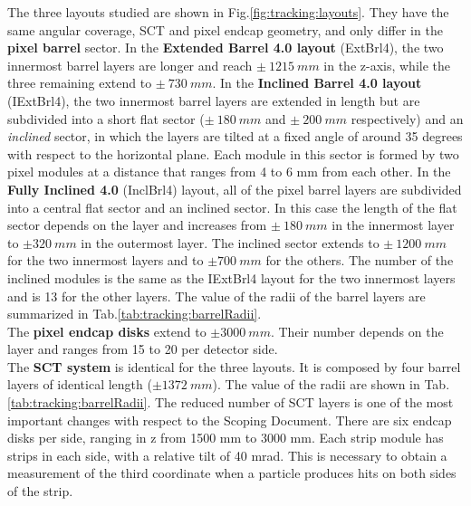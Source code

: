 \documentclass[a4paper,twoside,12pt]{book}
\begin{document}
The three layouts studied are shown in Fig.\ref{fig:tracking:layouts}. They have the same angular coverage, SCT and pixel endcap geometry, and only differ in the \textbf{pixel barrel} sector.
In the \textbf{Extended Barrel 4.0 layout} (ExtBrl4), the two innermost barrel layers are longer and
reach $\pm\ 1215\ mm$ in the z-axis, while the three remaining extend to $\pm\ 730\ mm$.
In the \textbf{Inclined Barrel 4.0 layout} (IExtBrl4), the two innermost barrel layers
are extended in length but are subdivided into a short flat sector ($\pm\ 180\ mm$ and $\pm\ 200\ mm$ respectively) and 
 an \textit{inclined} sector, in which the layers are tilted at a fixed angle of around 35 degrees with respect to the horizontal plane.
Each module in this sector is formed by two pixel modules at a distance that ranges from 4 to 6 mm from each other. In the \textbf{Fully Inclined 4.0} (InclBrl4) layout,
all of the pixel barrel layers are subdivided into a central flat sector and an inclined sector. In this case the length of the flat sector depends
on the layer and increases from $\pm\ 180\ mm$ in the innermost layer to $\pm 320\ mm$ in the outermost layer. The inclined sector extends
to $\pm\ 1200\ mm$ for the two innermost layers and to $\pm 700\ mm$ for the others. The number of the inclined modules is the same as the IExtBrl4 layout for the two innermost
layers and is 13 for the other layers. The value of the radii of the barrel layers are summarized in 
Tab.\ref{tab:tracking:barrelRadii}. \\

The \textbf{pixel endcap disks} extend to $\pm 3000\ mm$. Their 
number depends on the layer and ranges from 15 to 20 per detector side. \\

The \textbf{SCT system} is identical for the three layouts. It is composed by four barrel layers of identical length ($\pm 1372\ mm$). The value of the radii are shown in Tab.
\ref{tab:tracking:barrelRadii}. The reduced number of SCT layers is one of the most important changes
with respect to the Scoping Document\cite{scoping}. There
are six endcap disks per side, ranging in z from 1500 mm to 3000 mm. Each strip module
has strips in each side, with a relative tilt of 40 mrad. This is necessary to obtain a
measurement of the third coordinate when a particle produces hits on both sides of the
strip.\\
\end{document}
